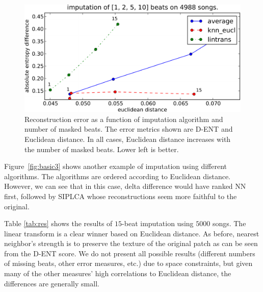 \documentclass{article}
\begin{document}
\begin{figure}[t]
\begin{center}
\includegraphics[width=.8\columnwidth]{recon_score_in_2d_5k_enhanced}
\end{center}
\caption{Reconstruction error as a function of imputation algorithm
  and number of masked beats.  The error metrics shown are D-ENT
  and Euclidean distance. In all cases, Euclidean distance increases
   with the number of masked beats. Lower left is better.
\label{fig:2dscore}}
\end{figure}

Figure~\ref{fig:basic3} shows another example of imputation using
different algorithms.  The algorithms are ordered according to
Euclidean distance.  However, we can see that in this case, delta
difference would have ranked NN first, followed by SIPLCA whose
reconstructions seem more faithful to the original.

Table \ref{tab:res} shows the results of $15$-beat imputation using
$5000$ songs. The linear transform is a clear winner based on
Euclidean distance. As before, nearest neighbor's strength is to
preserve the texture of the original patch as can be seen from the
D-ENT score.  We do not present all possible results (different
numbers of missing beats, other error measures, etc.) due to space
constraints, but given many of the other measures' high correlations
to Euclidean distance, the differences are generally small.

\end{document}
